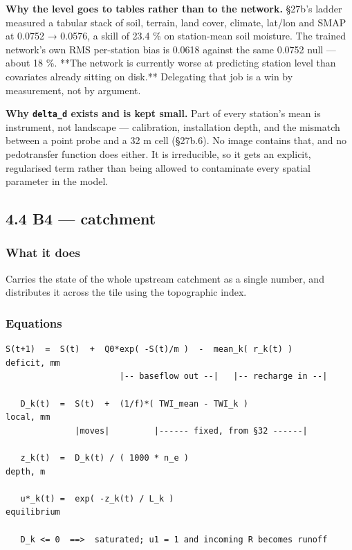 \documentclass[10pt,a4paper]{article}
\begin{document}
\textbf{Why the level goes to tables rather than to the network.} §27b's ladder
measured a tabular stack of soil, terrain, land cover, climate, lat/lon and SMAP
at 0.0752 → 0.0576, a skill of 23.4 \% on station-mean soil moisture. The trained
network's own RMS per-station bias is 0.0618 against the same 0.0752 null — about
18 \%. **The network is currently worse at predicting station level than
covariates already sitting on disk.** Delegating that job is a win by
measurement, not by argument.

\textbf{Why \texttt{delta\_d} exists and is kept small.} Part of every station's mean is
instrument, not landscape — calibration, installation depth, and the mismatch
between a point probe and a 32 m cell (§27b.6). No image contains that, and no
pedotransfer function does either. It is irreducible, so it gets an explicit,
regularised term rather than being allowed to contaminate every spatial
parameter in the model.

\subsection*{4.4 B4 — catchment}

\subsubsection*{What it does}

Carries the state of the whole upstream catchment as a single number, and
distributes it across the tile using the topographic index.

\subsubsection*{Equations}

\begin{Verbatim}[fontsize=\scriptsize,frame=leftline,framerule=0.6pt,rulecolor=\color{rulegray},xleftmargin=6pt,framesep=6pt,]
   S(t+1)  =  S(t)  +  Q0*exp( -S(t)/m )  -  mean_k( r_k(t) )      deficit, mm
                       |-- baseflow out --|   |-- recharge in --|

   D_k(t)  =  S(t)  +  (1/f)*( TWI_mean - TWI_k )                  local, mm
              |moves|         |------ fixed, from §32 ------|

   z_k(t)  =  D_k(t) / ( 1000 * n_e )                              depth, m

   u*_k(t) =  exp( -z_k(t) / L_k )                                 equilibrium

   D_k <= 0  ==>  saturated; u1 = 1 and incoming R becomes runoff
\end{Verbatim}
\end{document}
